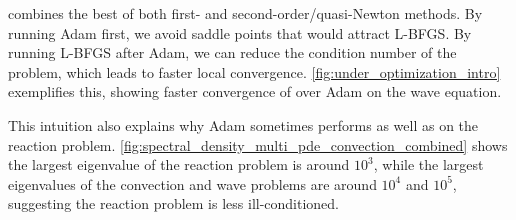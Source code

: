 \al{} combines the best of both first- and second-order/quasi-Newton methods. 
By running Adam first, we avoid saddle points that would attract L-BFGS.
By running L-BFGS after Adam, 
we can reduce the condition number of the problem, which leads to faster local convergence.
\cref{fig:under_optimization_intro} exemplifies this, showing faster convergence of \al{} over Adam on the wave equation.

This intuition also explains why Adam sometimes performs as well as \al{} on the reaction problem.
\cref{fig:spectral_density_multi_pde_convection_combined} shows the largest eigenvalue of the reaction problem is around $10^{3}$, 
while the largest eigenvalues of the convection and wave problems are around $10^{4}$ and $10^{5}$, suggesting the reaction problem is less ill-conditioned.

